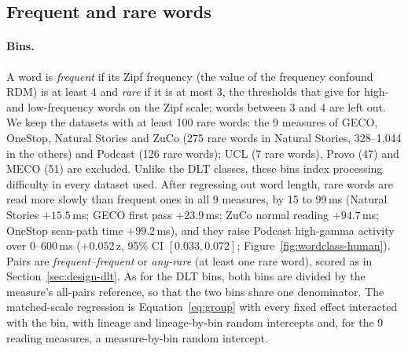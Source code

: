 \subsection{Frequent and rare words}
\label{app:wordclass-freq}


\paragraph{Bins.} A word is \emph{frequent} if its Zipf frequency (the value of the frequency confound RDM) is at least 4 and \emph{rare} if it is at most 3, the thresholds that \citet{vanheuven2014subtlex} give for high- and low-frequency words on the Zipf scale; words between 3 and 4 are left out. We keep the datasets with at least 100 rare words: the 9 measures of GECO, OneStop, Natural Stories and ZuCo (275 rare words in Natural Stories, 328--1{,}044 in the others) and Podcast (126 rare words); UCL (7 rare words), Provo (47) and MECO (51) are excluded. Unlike the DLT classes, these bins index processing difficulty in every dataset used. After regressing out word length, rare words are read more slowly than frequent ones in all 9 measures, by 15 to 99\,ms (Natural Stories $+15.5$\,ms; GECO first pass $+23.9$\,ms; ZuCo normal reading $+94.7$\,ms; OneStop scan-path time $+99.2$\,ms), and they raise Podcast high-gamma activity over 0--600\,ms ($+0.052$\,z, 95\% CI $[0.033, 0.072]$; Figure~\ref{fig:wordclass-human}). Pairs are \emph{frequent--frequent} or \emph{any-rare} (at least one rare word), scored as in Section~\ref{sec:design-dlt}. As for the DLT bins, both bins are divided by the measure's all-pairs reference, so that the two bins share one denominator. The matched-scale regression is Equation~\ref{eq:group} with every fixed effect interacted with the bin, with lineage and lineage-by-bin random intercepts and, for the 9 reading measures, a measure-by-bin random intercept.

